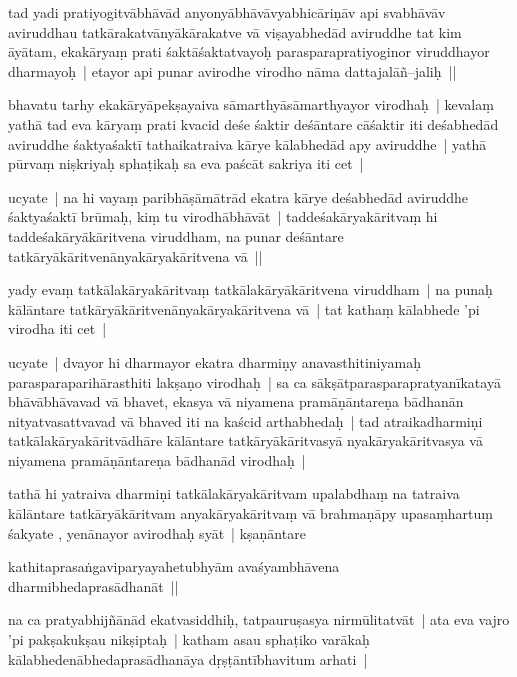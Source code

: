 \documentclass[article,a4paper]{memoir}
\begin{document}
	  \pstart tad yadi pratiyogitvā\-bhā\-vā\-d anyonyā\-bhā\-vā\-vyabhicā\-riṇā\-v api svabhā\-vā\-v aviruddhau tatkā\-rakatvā\-nyā\-kā\-rakatve vā\- viṣayabhedā\-d aviruddhe tat kim ā\-yā\-tam, ekakā\-ryaṃ prati śaktā\-śaktatvayoḥ parasparapratiyoginor viruddhayor dharmayoḥ | etayor api punar avirodhe virodho nā\-ma dattajalā\-ñ–jaliḥ ||
	\pend
      

	  \pstart bhavatu tarhy ekakā\-ryā\-pekṣayaiva sā\-marthyā\-sā\-marthyayor virodhaḥ | kevalaṃ yathā\- tad eva kā\-ryaṃ prati kvacid deśe śaktir deśā\-ntare cā\-śaktir iti deśabhedā\-d aviruddhe śaktyaśaktī\- tathaikatraiva kā\-rye kā\-labhedā\-d apy aviruddhe | yathā\- pū\-rvaṃ niṣkriyaḥ sphaṭikaḥ sa eva paścā\-t sakriya iti cet |
	\pend
      

	  \pstart ucyate | na hi vayaṃ paribhā\-ṣā\-mā\-trā\-d ekatra kā\-rye deśabhedā\-d aviruddhe śaktyaśaktī\- brū\-maḥ, kiṃ tu virodhā\-bhā\-vā\-t | taddeśakā\-ryakā\-ritvaṃ hi taddeśakā\-ryā\-kā\-ritvena viruddham, na punar deśā\-ntare tatkā\-ryā\-kā\-ritvenā\-nyakā\-ryakā\-ritvena vā\- ||
	\pend
      

	  \pstart yady evaṃ tatkā\-lakā\-ryakā\-ritvaṃ tatkā\-lakā\-ryā\-kā\-ritvena viruddham | na punaḥ kā\-lā\-ntare tatkā\-ryā\-kā\-ritvenā\-nyakā\-ryakā\-ritvena vā\- | tat kathaṃ kā\-labhede 'pi virodha iti cet |
	\pend
      

	  \pstart ucyate | dvayor hi dharmayor ekatra dharmiṇy anavasthitiniyamaḥ parasparaparihā\-rasthiti lakṣaṇo virodhaḥ | sa ca sā\-kṣā\-tparasparapratyanī\-katayā\- bhā\-vā\-bhā\-vavad vā\- bhavet, ekasya vā\- niyamena pramā\-ṇā\-ntareṇa bā\-dhanā\-n nityatvasattvavad vā\- bhaved iti na kaścid arthabhedaḥ | tad atraikadharmiṇi tatkā\-lakā\-ryakā\-ritvā\-dhā\-re kā\-lā\-ntare tatkā\-ryā\-kā\-ritvasyā\- nyakā\-ryakā\-ritvasya vā\- niyamena pramā\-ṇā\-ntareṇa bā\-dhanā\-d virodhaḥ | 
	\pend
      

	  \pstart tathā\- hi yatraiva dharmiṇi tatkā\-lakā\-ryakā\-ritvam upalabdhaṃ na tatraiva kā\-lā\-ntare tatkā\-ryā\-kā\-ritvam anyakā\-ryakā\-ritvaṃ vā\- brahmaṇā\-py upasaṃhartuṃ śakyate , yenā\-nayor avirodhaḥ syā\-t | kṣaṇā\-ntare
	\pend
      

	  \pstart kathitaprasaṅgaviparyayahetubhyā\-m avaśyambhā\-vena dharmibhedaprasā\-dhanā\-t ||
	\pend
      

	  \pstart na ca pratyabhijñā\-nā\-d ekatvasiddhiḥ, tatpauruṣasya nirmū\-litatvā\-t | ata eva vajro 'pi pakṣakukṣau nikṣiptaḥ | katham asau sphaṭiko varā\-kaḥ kā\-labhedenā\-bhedaprasā\-dhanā\-ya dṛṣṭā\-ntī\-bhavitum arhati | 
	\pend
      
\end{document}
